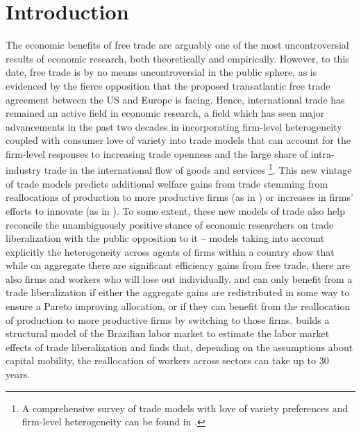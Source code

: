 \documentclass[a4paper,12pt]{article}
\begin{document}
\section{Introduction}
The economic benefits of free trade are arguably one of the most uncontroversial results of economic research, both theoretically and empirically. However, to this date, free trade is by no means uncontroversial in the public sphere, as is evidenced by the fierce opposition that the proposed transatlantic free trade agreement between the US and Europe is facing. Hence, international trade has remained an active field in economic research, a field which has seen major advancements in the past two decades in incorporating firm-level heterogeneity coupled with consumer love of variety into trade models that can account for the firm-level responses to increasing trade openness and the large share of intra-industry trade in the international flow of goods and services \footnote{A comprehensive survey of trade models with love of variety preferences and firm-level heterogeneity can be found in \citet*{MelitzTrefler2012}.}. This new vintage of trade models predicts additional welfare gains from trade stemming from reallocations of production to more productive firms (as in \citealp{Melitz2003}) or increases in firms' efforts to innovate (as in \citealp{GrossmanHelpman1990}). To some extent, these new models of trade also help reconcile the unambiguously positive stance of economic researchers on trade liberalization with the public opposition to it -- models taking into account explicitly the heterogeneity across agents of firms within a country show that while on aggregate there are significant efficiency gains from free trade, there are also firms and workers who will lose out individually, and can only benefit from a trade liberalization if either the aggregate gains are redistributed in some way to ensure a Pareto improving allocation, or if they can benefit from the reallocation of production to more productive firms by switching to those firms. \citet{DixCarneiro2014} builds a structural model of the Brazilian labor market to estimate the labor market effects of trade liberalization and finds that, depending on the assumptions about capital mobility, the reallocation of workers across sectors can take up to 30 years. \\
\end{document}
